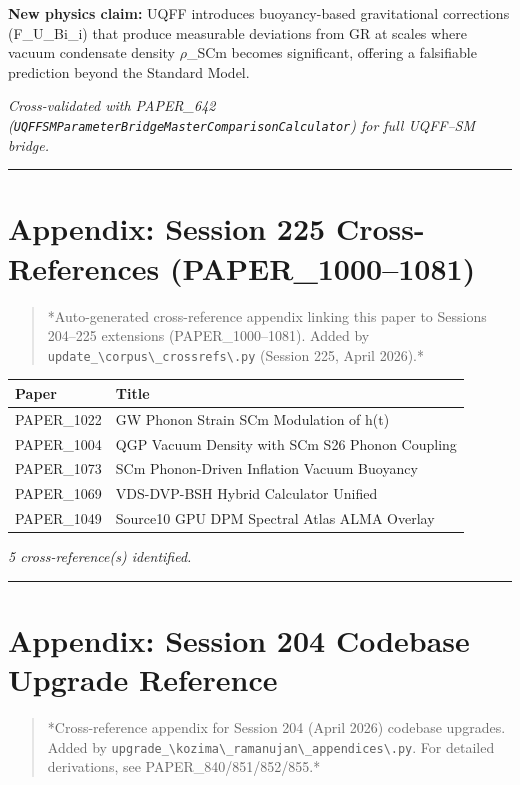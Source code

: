 \documentclass[12pt,a4paper]{article}
\begin{document}
\textbf{New physics claim:} UQFF introduces buoyancy-based gravitational corrections (F\_{U\_Bi\_i}) that produce measurable deviations from GR at scales where vacuum condensate density $\rho$\_SCm becomes significant, offering a falsifiable prediction beyond the Standard Model.

\emph{Cross-validated with PAPER\_642 (\texttt{UQFFSMParameterBridgeMasterComparisonCalculator}) for full UQFF--SM bridge.}

\medskip\hrule\medskip

\section{Appendix: Session 225 Cross-References (PAPER\_1000--1081)}

\begin{quote}
*Auto-generated cross-reference appendix linking this paper to
Sessions 204--225 extensions (PAPER\_1000--1081). Added by
\texttt{update\_\textbackslash {corpus\textbackslash \_crossrefs\textbackslash }.py} (Session 225, April 2026).*
\end{quote}

\begin{table}[H]
\centering
\small
\begin{tabularx}{\linewidth}{@{}>{\raggedright\arraybackslash}X>{\raggedright\arraybackslash}X@{}}
\toprule
Paper & Title \tabularnewline
\midrule
PAPER\_1022 & GW Phonon Strain SCm Modulation of h(t) \tabularnewline
PAPER\_1004 & QGP Vacuum Density with SCm S26 Phonon Coupling \tabularnewline
PAPER\_1073 & SCm Phonon-Driven Inflation Vacuum Buoyancy \tabularnewline
PAPER\_1069 & VDS-DVP-BSH Hybrid Calculator Unified \tabularnewline
PAPER\_1049 & Source10 GPU DPM Spectral Atlas ALMA Overlay \tabularnewline
\bottomrule
\end{tabularx}
\end{table}

\emph{5 cross-reference(s) identified.}

\medskip\hrule\medskip

\section{Appendix: Session 204 Codebase Upgrade Reference}

\begin{quote}
*Cross-reference appendix for Session 204 (April 2026) codebase upgrades.
Added by \texttt{upgrade\_\textbackslash {kozima\textbackslash \_ramanujan\textbackslash \_appendices\textbackslash }.py}. For detailed derivations,
see PAPER\_840/851/852/855.*
\end{quote}
\end{document}
